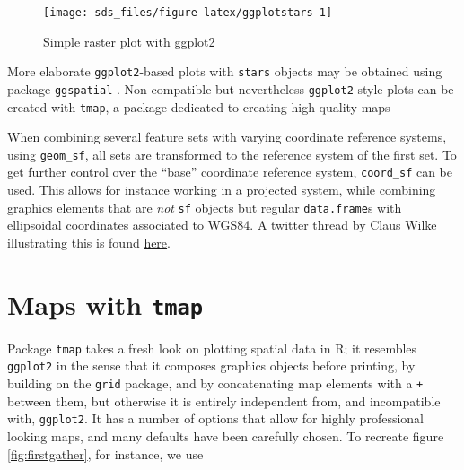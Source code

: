 \documentclass[]{book}
\newenvironment{Shaded}{\begin{snugshade}}{\end{snugshade}}
\newcommand{\DataTypeTok}[1]{\textcolor[rgb]{0.13,0.29,0.53}{#1}}
\newcommand{\FloatTok}[1]{\textcolor[rgb]{0.00,0.00,0.81}{#1}}
\newcommand{\KeywordTok}[1]{\textcolor[rgb]{0.13,0.29,0.53}{\textbf{#1}}}
\newcommand{\NormalTok}[1]{#1}
\newcommand{\OperatorTok}[1]{\textcolor[rgb]{0.81,0.36,0.00}{\textbf{#1}}}
\newcommand{\StringTok}[1]{\textcolor[rgb]{0.31,0.60,0.02}{#1}}
\begin{document}
\begin{figure}

{\centering \texttt{[image: sds\_files/figure-latex/ggplotstars-1]} 

}

\caption{Simple raster plot with ggplot2}\label{fig:ggplotstars}
\end{figure}

More elaborate \texttt{ggplot2}-based plots with \texttt{stars} objects may be
obtained using package \texttt{ggspatial} \citep{R-ggspatial}. Non-compatible
but nevertheless \texttt{ggplot2}-style plots can be created with \texttt{tmap},
a package dedicated to creating high quality maps

When combining several feature sets with varying coordinate reference
systems, using \texttt{geom\_sf}, all sets are transformed to the reference
system of the first set. To get further control over the ``base''
coordinate reference system, \texttt{coord\_sf} can be used. This allows
for instance working in a projected system, while combining graphics
elements that are \emph{not} \texttt{sf} objects but regular \texttt{data.frame}s
with ellipsoidal coordinates associated to WGS84. A
twitter thread by Claus Wilke illustrating this is found
\href{https://twitter.com/ClausWilke/status/1275938314055561216}{here}.

\hypertarget{tmap}{%
\section{\texorpdfstring{Maps with \texttt{tmap}}{Maps with tmap}}\label{tmap}}

Package \texttt{tmap} \citep{R-tmap, tmap} takes a fresh look on plotting
spatial data in R; it resembles \texttt{ggplot2} in the sense that it
composes graphics objects before printing, by building on the \texttt{grid}
package, and by concatenating map elements with a \texttt{+} between them,
but otherwise it is entirely independent from, and incompatible
with, \texttt{ggplot2}. It has a number of options that allow for highly
professional looking maps, and many defaults have been carefully
chosen. To recreate figure \ref{fig:firstgather}, for instance,
we use

\begin{Shaded}
\end{Shaded}
\end{document}
